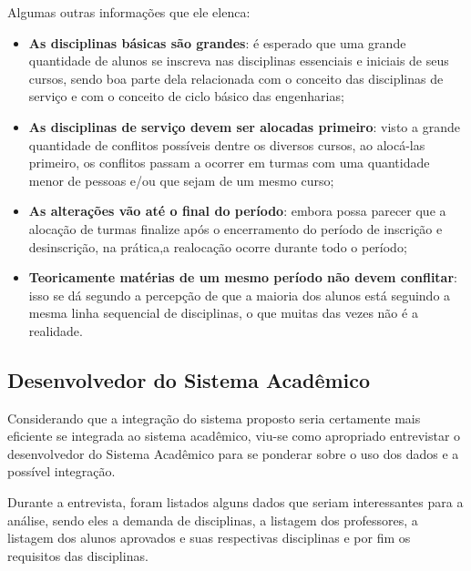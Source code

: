 Algumas outras informações que ele elenca:

\begin{itemize}
  \item \textbf{As disciplinas básicas são grandes}: é esperado que uma grande quantidade de alunos se inscreva nas disciplinas essenciais e iniciais de seus cursos, sendo boa parte dela relacionada com o conceito das disciplinas de serviço e com o conceito de ciclo básico das engenharias;
  \item \textbf{As disciplinas de serviço devem ser alocadas primeiro}: visto a grande quantidade de conflitos possíveis dentre os diversos cursos, ao alocá-las primeiro, os conflitos passam a ocorrer em turmas com uma quantidade menor de pessoas e/ou que sejam de um mesmo curso;
  \item \textbf{As alterações vão até o final do período}: embora possa parecer que a alocação de turmas finalize após o encerramento do período de inscrição e desinscrição, na prática,a realocação ocorre durante todo o período;
  \item \textbf{Teoricamente matérias de um mesmo período não devem conflitar}: isso se dá segundo a percepção de que a maioria dos alunos está seguindo a mesma linha sequencial de disciplinas, o que muitas das vezes não é a realidade.
\end{itemize}

\subsection{Desenvolvedor do Sistema Acadêmico} %

Considerando que a integração do sistema proposto seria certamente mais eficiente se integrada ao sistema acadêmico, viu-se como apropriado entrevistar o desenvolvedor do Sistema Acadêmico para se ponderar sobre o uso dos dados e a possível integração.

Durante a entrevista, foram listados alguns dados que seriam interessantes para a análise, sendo eles a demanda de disciplinas, a listagem dos professores, a listagem dos alunos aprovados e suas respectivas disciplinas e por fim os requisitos das disciplinas.

